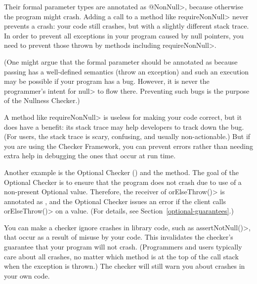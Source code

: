 Their formal parameter types are annotated as \<@NonNull>, because otherwise the
program might crash.  Adding a call to a method like \<requireNonNull>
never prevents a crash:  your code still crashes, but with a slightly
different stack trace.  In order to prevent all exceptions in your program
caused by null pointers, you need to prevent those thrown by methods including
\<requireNonNull>.

(One might argue that the formal parameter should be annotated as
 because passing  has a
well-defined semantics (throw an exception) and such an execution may be
possible if your program has a bug.  However, it is never the programmer's
intent for \<null> to flow there.  Preventing such bugs is the purpose of
the Nullness Checker.)

A method like \<requireNonNull> is useless for making your code correct,
but it does have a benefit:  its stack trace may help developers to track
down the bug.  (For users, the stack trace is scary, confusing, and usually
non-actionable.)  But if you are using the Checker Framework, you can
prevent errors rather than needing extra help in debugging the ones that
occur at run time.


Another example is the Optional Checker ()
and the  method.
The goal of the Optional Checker is to ensure that the program does not
crash due to use of a non-present Optional value.  Therefore, the receiver
of
\<orElseThrow()> is annotated as
,
and the Optional Checker issues an error if the client calls
\<orElseThrow()> on a  value.
(For details, see Section~\ref{optional-guarantees}.)


You can make a checker ignore crashes in library code, such as
\<assertNotNull()>, that occur as a result of misuse by your code.
This invalidates the checker's guarantee that your program will not crash.
(Programmers and users typically care about all crashes, no matter which
method is at the top of the call stack when the exception is thrown.)
The checker will still warn you about crashes in your own code.

